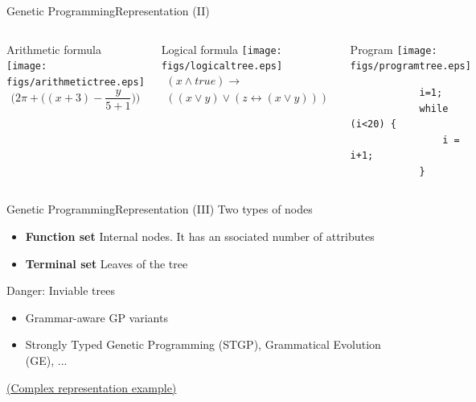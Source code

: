 \documentclass[10pt,compress]{beamer} %
\begin{document}
\begin{frame}[fragile]{Genetic Programming}{Representation (II)}
    \begin{columns}
	   		\begin{center}
	    	Arithmetic formula
			\texttt{[image: figs/arithmetictree.eps]}\\
			\begin{equation*}
			\bigg( 2\pi + \big((x+3)-\frac{y}{5+1}\big)\bigg)
			\end{equation*}	
			\end{center}
	   		\begin{center}
	    	Logical formula
			\texttt{[image: figs/logicaltree.eps]}\\
			\begin{multline*}
			(x	\wedge true) \to \\((x \vee y) \vee (z \leftrightarrow (x\vee y)))
			\end{multline*}	
			\end{center}
	   		\begin{center}
	    	Program
			\texttt{[image: figs/programtree.eps]}\\
			\begin{verbatim}
			i=1;
			while (i<20) {
				i = i+1;
			}
			\end{verbatim}	
			\end{center}
	\end{columns}
\end{frame}

\begin{frame}[fragile]{Genetic Programming}{Representation (III)}
	Two types of nodes
	\begin{itemize}
		\item \textbf{Function set} Internal nodes. It has an ssociated number of attributes
		\item \textbf{Terminal set} Leaves of the tree
	\end{itemize}
	Danger: Inviable trees
	\begin{itemize}
		\item Grammar-aware GP variants
		\item Strongly Typed Genetic Programming (STGP), Grammatical Evolution (GE), ...
	\end{itemize}
	\href{http://www.genetic-programming.com/gpcircuitanimation.gif}{(Complex representation example)}
\end{frame}
\end{document}
